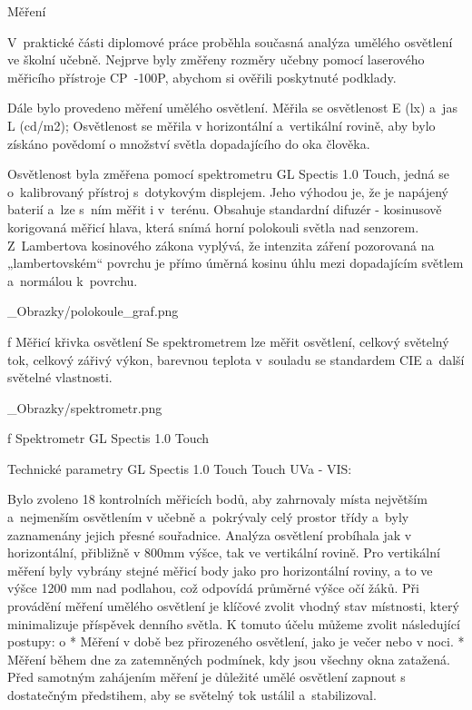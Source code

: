 \chap Měření

V~praktické části diplomové práce proběhla současná analýza umělého osvětlení ve školní učebně.
Nejprve byly změřeny rozměry učebny pomocí laserového měřicího přístroje {\sbf CP~-100P},
abychom si ověřili poskytnuté podklady.

Dále bylo provedeno měření umělého osvětlení. Měřila se osvětlenost E (lx) a~jas L (cd/m2);
Osvětlenost se měřila v horizontální a~vertikální rovině, aby bylo získáno povědomí o množství světla dopadajícího do oka člověka.

Osvětlenost byla změřena pomocí spektrometru {\sbf GL Spectis 1.0 Touch}, jedná se o~kalibrovaný přístroj
s~dotykovým displejem. Jeho výhodou je, že je napájený baterií a~lze s~ním měřit i v~terénu. Obsahuje standardní
difuzér - kosinusově korigovaná měřicí hlava, která snímá horní polokouli světla nad senzorem. Z~Lambertova
kosinového zákona vyplývá, že intenzita záření pozorovaná na „lambertovském“ povrchu je přímo úměrná kosinu
úhlu mezi dopadajícím světlem a~normálou k~povrchu.

\medskip {}
\picw=8cm _Obrazky/polokoule_graf.png
\caption/f Měřicí křivka osvětlení
\medskip
Se spektrometrem lze měřit osvětlení, celkový světelný tok, celkový zářivý výkon, barevnou teplota v~souladu
se standardem CIE a~další světelné vlastnosti.

\medskip {}
\picw=5cm _Obrazky/spektrometr.png
\caption/f Spektrometr GL Spectis 1.0 Touch
\medskip

\medskip
{\sbf Technické parametry GL Spectis 1.0 Touch Touch UVa - VIS:}
\medskip
{}

Bylo zvoleno 18 kontrolních měřicích bodů, aby zahrnovaly místa  největším a~nejmenším osvětlením v učebně a~pokrývaly celý prostor třídy
a~byly zaznamenány jejich přesné souřadnice. Analýza osvětlení probíhala jak v horizontální,
přibližně v 800mm výšce, tak ve vertikální rovině. Pro vertikální měření byly vybrány stejné měřicí body jako pro horizontální roviny,
a to ve výšce 1200 mm nad podlahou, což odpovídá průměrné výšce očí žáků.
\medskip
Při provádění měření umělého osvětlení je klíčové zvolit vhodný stav místnosti,
který minimalizuje příspěvek denního světla. K tomuto účelu můžeme zvolit následující postupy:
\medskip
\begitems \style o
    * Měření v době bez přirozeného osvětlení, jako je večer nebo v noci.
    * Měření během dne za zatemněných podmínek, kdy jsou všechny okna zatažená.
\enditems
\medskip
Před samotným zahájením měření je důležité umělé osvětlení zapnout s dostatečným předstihem, aby se světelný tok ustálil a~stabilizoval.

